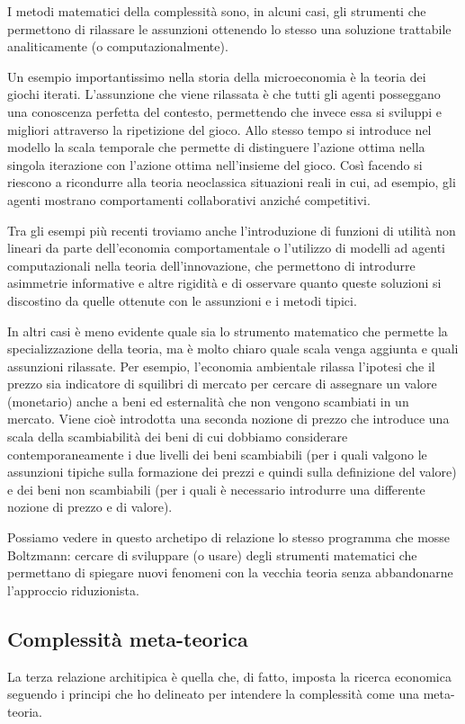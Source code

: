 \documentclass[a4paper, headings=standardclasses]{scrartcl}
\begin{document}
I metodi matematici della complessità sono, in alcuni casi, gli strumenti che permettono di rilassare le assunzioni ottenendo lo stesso una soluzione trattabile analiticamente (o computazionalmente).

Un esempio importantissimo nella storia della microeconomia è la teoria dei giochi iterati. L'assunzione che viene rilassata è che tutti gli agenti posseggano una conoscenza perfetta del contesto, permettendo che invece essa si sviluppi e migliori attraverso la ripetizione del gioco. Allo stesso tempo si introduce nel modello la scala temporale che permette di distinguere l'azione ottima nella singola iterazione con l'azione ottima nell'insieme del gioco.
Così facendo si riescono a ricondurre alla teoria neoclassica situazioni reali in cui, ad esempio, gli agenti mostrano comportamenti collaborativi anziché competitivi.

Tra gli esempi più recenti troviamo anche l'introduzione di funzioni di utilità non lineari
da parte dell'economia comportamentale o l'utilizzo di modelli ad agenti computazionali nella teoria dell'innovazione, che permettono di introdurre asimmetrie informative e altre rigidità e di osservare quanto queste soluzioni si discostino da quelle ottenute con le assunzioni e i metodi tipici.

In altri casi è meno evidente quale sia lo strumento matematico che permette la specializzazione della teoria, ma è molto chiaro quale scala venga aggiunta e quali assunzioni rilassate. Per esempio, l'economia ambientale rilassa l'ipotesi che il prezzo sia indicatore di squilibri di mercato per cercare di assegnare un valore (monetario) anche a beni ed esternalità che non vengono scambiati in un mercato.
Viene cioè introdotta una seconda nozione di prezzo che introduce una scala della scambiabilità dei beni di cui dobbiamo considerare contemporaneamente i due livelli dei beni scambiabili (per i quali valgono le assunzioni tipiche sulla formazione dei prezzi e quindi sulla definizione del valore) e dei beni non scambiabili (per i quali è necessario introdurre una differente nozione di prezzo e di valore).

Possiamo vedere in questo archetipo di relazione lo stesso programma che mosse Boltzmann: cercare di sviluppare (o usare) degli strumenti matematici che permettano di spiegare nuovi fenomeni con la vecchia teoria senza abbandonarne l'approccio riduzionista.

\subsection{Complessità meta-teorica}
La terza relazione architipica è quella che, di fatto, imposta la ricerca economica seguendo i principi che ho delineato per intendere la complessità come una meta-teoria.
\end{document}
